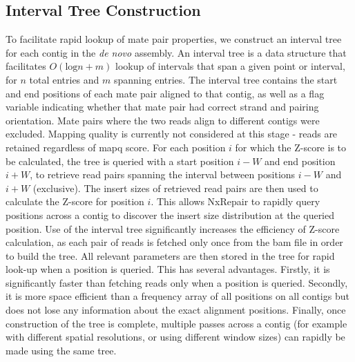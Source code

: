 \subsection*{Interval Tree Construction}
To facilitate rapid lookup of mate pair properties, we construct an interval tree~\cite{cormen2009} for each contig in the \textit{de novo} assembly. An interval tree is a data structure that facilitates $O(\text{log} n + m)$ lookup of intervals that span a given point or interval, for $n$ total entries and $m$ spanning entries. The interval tree contains the start and end positions of each mate pair aligned to that contig, as well as a flag variable indicating whether that mate pair had correct strand and pairing orientation. Mate pairs where the two reads align to different contigs were excluded. Mapping quality is currently not considered at this stage - reads are retained regardless of mapq score. For each position $i$ for which the Z-score is to be calculated, the tree is queried with a start position $i-W$ and end position $i+W$, to retrieve read pairs spanning the interval between positions $i-W$ and $i+W$ (exclusive). The insert sizes of retrieved read pairs are then used to calculate the Z-score for position $i$. This allows NxRepair to rapidly query positions across a contig to discover the insert size distribution at the queried position. Use of the interval tree significantly increases the efficiency of Z-score calculation, as each pair of reads is fetched only once from the bam file in order to build the tree. All relevant parameters are then stored in the tree for rapid look-up when a position is queried. This has several advantages. Firstly, it is significantly faster than fetching reads only when a position is queried. Secondly, it is more space efficient than a frequency array of all positions on all contigs but does not lose any information about the exact alignment positions. Finally, once construction of the tree is complete, multiple passes across a contig (for example with different spatial resolutions, or using different window sizes) can rapidly be made using the same tree.      


